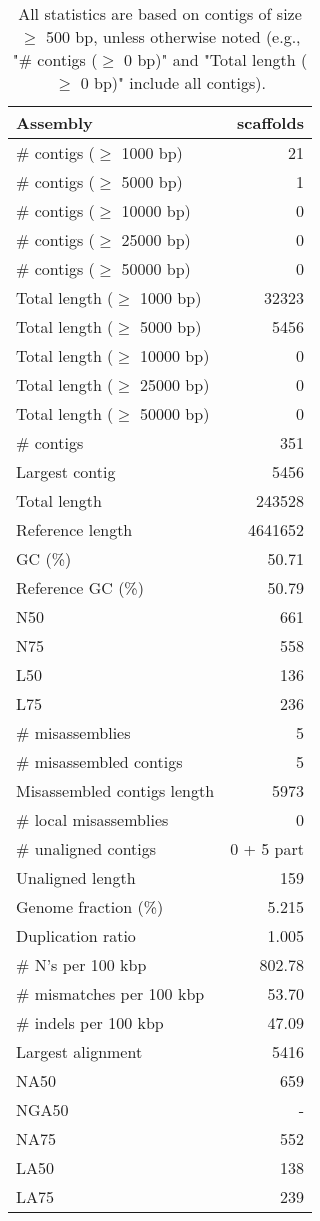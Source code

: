 \documentclass[12pt,a4paper]{article}
\begin{document}
\begin{table}[ht]
\begin{center}
\caption{All statistics are based on contigs of size $\geq$ 500 bp, unless otherwise noted (e.g., "\# contigs ($\geq$ 0 bp)" and "Total length ($\geq$ 0 bp)" include all contigs).}
\begin{tabular}{|l*{1}{|r}|}
\hline
Assembly & scaffolds \\ \hline
\# contigs ($\geq$ 1000 bp) & 21 \\ \hline
\# contigs ($\geq$ 5000 bp) & 1 \\ \hline
\# contigs ($\geq$ 10000 bp) & 0 \\ \hline
\# contigs ($\geq$ 25000 bp) & 0 \\ \hline
\# contigs ($\geq$ 50000 bp) & 0 \\ \hline
Total length ($\geq$ 1000 bp) & 32323 \\ \hline
Total length ($\geq$ 5000 bp) & 5456 \\ \hline
Total length ($\geq$ 10000 bp) & 0 \\ \hline
Total length ($\geq$ 25000 bp) & 0 \\ \hline
Total length ($\geq$ 50000 bp) & 0 \\ \hline
\# contigs & 351 \\ \hline
Largest contig & 5456 \\ \hline
Total length & 243528 \\ \hline
Reference length & 4641652 \\ \hline
GC (\%) & 50.71 \\ \hline
Reference GC (\%) & 50.79 \\ \hline
N50 & 661 \\ \hline
N75 & 558 \\ \hline
L50 & 136 \\ \hline
L75 & 236 \\ \hline
\# misassemblies & 5 \\ \hline
\# misassembled contigs & 5 \\ \hline
Misassembled contigs length & 5973 \\ \hline
\# local misassemblies & 0 \\ \hline
\# unaligned contigs & 0 + 5 part \\ \hline
Unaligned length & 159 \\ \hline
Genome fraction (\%) & 5.215 \\ \hline
Duplication ratio & 1.005 \\ \hline
\# N's per 100 kbp & 802.78 \\ \hline
\# mismatches per 100 kbp & 53.70 \\ \hline
\# indels per 100 kbp & 47.09 \\ \hline
Largest alignment & 5416 \\ \hline
NA50 & 659 \\ \hline
NGA50 & - \\ \hline
NA75 & 552 \\ \hline
LA50 & 138 \\ \hline
LA75 & 239 \\ \hline
\end{tabular}
\end{center}
\end{table}
\end{document}
